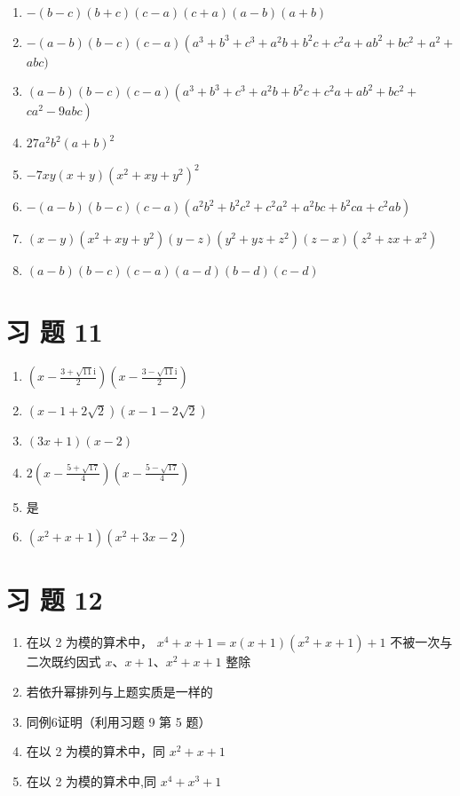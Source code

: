 \documentclass[10pt]{article}
\begin{document}
\begin{enumerate}
  \item $-(b-c)(b+c)(c-a)(c+a)(a-b)(a+b)$
  \item $-(a-b)(b-c)(c-a)\left(a^{3}+b^{3}+c^{3}+a^{2} b+b^{2} c+c^{2} a+a b^{2}+b c^{2}+a^{2}+\right.$ $a b c)$
  \item $(a-b)(b-c)(c-a)\left(a^{3}+b^{3}+c^{3}+a^{2} b+b^{2} c+c^{2} a+a b^{2}+b c^{2}+\right.$ $\left.c a^{2}-9 a b c\right)$
  \item $27 a^{2} b^{2}(a+b)^{2}$
  \item $-7 x y(x+y)\left(x^{2}+x y+y^{2}\right)^{2}$
  \item $-(a-b)(b-c)(c-a)\left(a^{2} b^{2}+b^{2} c^{2}+c^{2} a^{2}+a^{2} b c+b^{2} c a+c^{2} a b\right)$
  \item $(x-y)\left(x^{2}+x y+y^{2}\right)(y-z)\left(y^{2}+y z+z^{2}\right)(z-x)\left(z^{2}+z x+x^{2}\right)$
  \item $(a-b)(b-c)(c-a)(a-d)(b-d)(c-d)$
\end{enumerate}

\section*{习 题 11}
\begin{enumerate}
  \item $\left(x-\frac{3+\sqrt{11} \mathrm{i}}{2}\right)\left(x-\frac{3-\sqrt{11} \mathrm{i}}{2}\right)$
  \item $(x-1+2 \sqrt{2})(x-1-2 \sqrt{2})$
  \item $(3 x+1)(x-2)$
  \item $2\left(x-\frac{5+\sqrt{17}}{4}\right)\left(x-\frac{5-\sqrt{17}}{4}\right)$
  \item 是
  \item $\left(x^{2}+x+1\right)\left(x^{2}+3 x-2\right)$
\end{enumerate}

\section*{习 题 12}
\begin{enumerate}
  \item 在以 2 为模的算术中， $x^{4}+x+1=x(x+1)\left(x^{2}+x+1\right)+1$ 不被一次与二次既约因式 $x 、 x+1 、 x^{2}+x+1$ 整除
  \item 若依升幂排列与上题实质是一样的
  \item 同例6证明（利用习题 9 第 5 题）
  \item 在以 2 为模的算术中，同 $x^{2}+x+1$
  \item 在以 2 为模的算术中,同 $x^{4}+x^{3}+1$
\end{enumerate}
\end{document}
